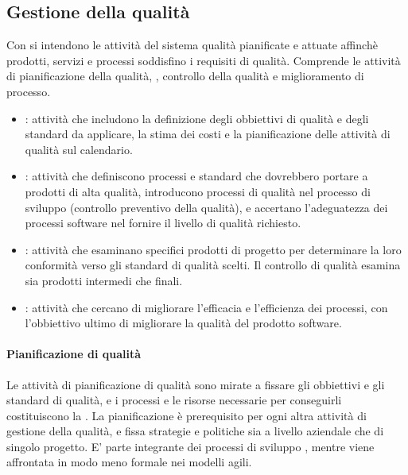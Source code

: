 \subsection{Gestione della qualità}

Con  si intendono le attività del sistema qualità
pianificate e attuate affinchè prodotti, servizi e processi soddisfino i
requisiti di qualità. Comprende le attività di pianificazione della qualità,
, controllo della qualità e miglioramento di
processo.

\begin{itemize}
  \item {}: attività che includono la
    definizione degli obbiettivi di qualità e degli standard da applicare, la
    stima dei costi e la pianificazione delle attività di qualità sul
    calendario.
  \item {}: attività che definiscono processi
    e standard che dovrebbero portare a prodotti di alta qualità, introducono
    processi di qualità nel processo di sviluppo (controllo preventivo della
    qualità), e accertano l'adeguatezza dei processi software nel fornire il
    livello di qualità richiesto.
  \item {}: attività che esaminano specifici
    prodotti di progetto per determinare la loro conformità verso gli standard
    di qualità scelti. Il controllo di qualità esamina sia prodotti intermedi
    che finali.
  \item {}: attività che cercano di migliorare
    l'efficacia e l'efficienza dei processi, con l'obbiettivo ultimo di
    migliorare la qualità del prodotto software.
\end{itemize}

\paragraph{Pianificazione di qualità}

Le attività di pianificazione di qualità sono mirate a fissare gli obbiettivi e
gli standard di qualità, e i processi e le risorse necessarie per conseguirli
costituiscono la . La pianificazione è
prerequisito per ogni altra attività di gestione della qualità, e fissa
strategie e politiche sia a livello aziendale che di singolo progetto. E' parte
integrante dei processi di sviluppo , mentre viene
affrontata in modo meno formale nei modelli agili.

